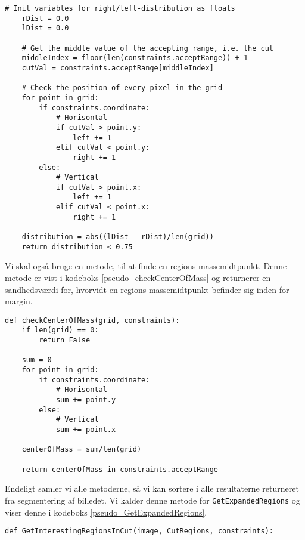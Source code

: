 {\begin{lstlisting}[caption={Metode som, på baggrund af regionens
    fordeling af masse, afgør, om denne region er jævnt fordelt},
    captionpos=b, label={pseudo_distribution}, frame=tb,
    breaklines=false, float=t]
    # Init variables for right/left-distribution as floats
    rDist = 0.0
    lDist = 0.0

    # Get the middle value of the accepting range, i.e. the cut
    middleIndex = floor(len(constraints.acceptRange)) + 1
    cutVal = constraints.acceptRange[middleIndex]

    # Check the position of every pixel in the grid
    for point in grid:
        if constraints.coordinate:
            # Horisontal
            if cutVal > point.y:
                left += 1
            elif cutVal < point.y:
                right += 1
        else:
            # Vertical
            if cutVal > point.x:
                left += 1
            elif cutVal < point.x:
                right += 1

    distribution = abs((lDist - rDist)/len(grid))
    return distribution < 0.75
\end{lstlisting}

Vi skal også bruge en metode, til at finde en regions massemidtpunkt.
Denne metode er vist i kodeboks \ref{pseudo_checkCenterOfMass} og
returnerer en sandhedsværdi for, hvorvidt en regions massemidtpunkt
befinder sig inden for margin.

\begin{lstlisting}[caption={Metode, som kontrollerer, om en regions
    massemidtpunkt er inden for margin.}, captionpos=b,
    label={pseudo_checkCenterOfMass}, frame=tb, breaklines=false,
    float=t]
def checkCenterOfMass(grid, constraints):
    if len(grid) == 0:
        return False

    sum = 0
    for point in grid:
        if constraints.coordinate:
            # Horisontal
            sum += point.y
        else:
            # Vertical
            sum += point.x

    centerOfMass = sum/len(grid)

    return centerOfMass in constraints.acceptRange
\end{lstlisting}

Endeligt samler vi alle metoderne, så vi kan sortere i alle resultaterne
returneret fra segmentering af billedet. Vi kalder denne metode for
\texttt{GetExpandedRegions} og viser denne i kodeboks
\ref{pseudo_GetExpandedRegions}.

\begin{lstlisting}[caption={Pseudokode, som returnerer alle interessante
    regioner, der er nævnt fordelt over snittet og har et massemidtpunkt
    inden for margin.},
    captionpos=b, label={pseudo_GetExpandedRegions}, frame=tb, breaklines=false,
    float=hb]
def GetInterestingRegionsInCut(image, CutRegions, constraints):


\end{lstlisting}}
